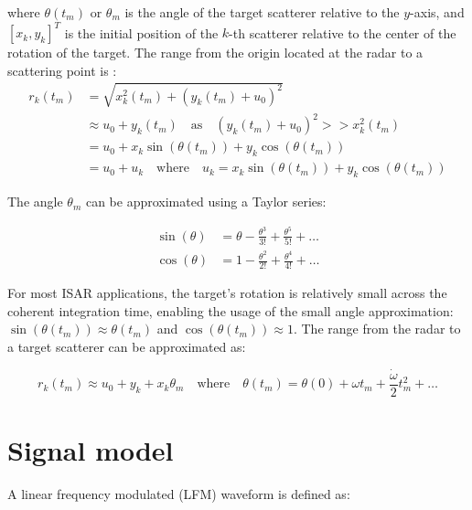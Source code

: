 \documentclass[fleqn,10pt]{olplainarticle}
\begin{document}
\noindent where $\theta(t_{m})$ or $\theta_m$ is the angle of the target scatterer relative to the $y$-axis, and $[x_{k}, y_{k}]^{T}$ is the initial position of the $k$-th scatterer relative to the center of the rotation of the target. The range from the origin located at the radar to a scattering point is \citep{Xu2022}:
\begin{equation}
    \begin{aligned}
        r_{k}(t_m) &= \sqrt{x_{k}^2(t_m) + (y_k(t_{m}) + u_{0})^2}\\
        &\approx u_{0} + y_{k}(t_m) \quad \mathrm{as} \quad (y_k(t_{m}) + u_{0})^2 >> x_{k}^2(t_m)\\
        &= u_{0} + x_{k} \sin(\theta(t_{m})) + y_{k}\cos(\theta(t_{m}))\\
        &= u_{0} + u_{k} \quad \mathrm{where} \quad u_{k} = x_{k} \sin(\theta(t_{m})) + y_{k}\cos(\theta(t_{m}))
    \end{aligned} 
    \label{eq:r}
\end{equation}

\noindent The angle $\theta_m$ can be approximated using a Taylor series:

\begin{equation}
    \begin{aligned}
        \sin(\theta) &= \theta - \frac{\theta^3}{3!} + \frac{\theta^{5}}{5!} + \dots \\
        \cos(\theta) &= 1 - \frac{\theta^2}{2!} + \frac{\theta^{4}}{4!} + \dots
    \end{aligned}
\end{equation}

\noindent For most ISAR applications, the target's rotation is relatively small across the coherent integration time, enabling the usage of the small angle approximation: $\sin(\theta(t_{m})) \approx\theta(t_{m})$ and $\cos(\theta(t_m)) \approx 1$. The range from the radar to a target scatterer can be approximated as:

\begin{equation}
    r_{k}(t_{m}) \approx u_{0} + y_{k} + x_{k}\theta_{m} \quad \mathrm{where} \quad \theta(t_{m}) = \theta(0) + \omega t_{m} + \frac{\dot{\omega}}{2}t_{m}^{2} + \dots
\end{equation}


\section*{Signal model}

A linear frequency modulated (LFM) waveform is defined as:
\end{document}
